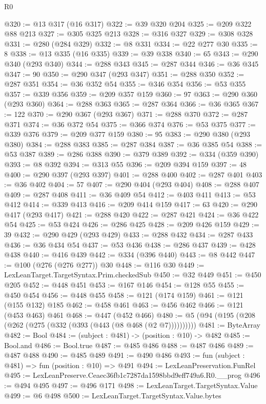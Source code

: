 \begin{lexlean}{R0}
\begin{coremodule}
@320 := @13 @317 (@16 @317)
@322 := @39 @320 @204
@325 := @209 @322 @88 @213
@327 := @305 @325 @213
@328 := @316 @327
@329 := @308 @328
@331 := @280 (@284 @329)
@332 := @8 @331
@334 := @22 @277 @30
@335 := 8
@338 := @13 @335 (@16 @335)
@339 := @39 @338
@340 := 65
@343 := @290 @340 (@293 @340)
@344 := @288 @343
@345 := @287 @344
@346 := @36 @345
@347 := 90
@350 := @290 @347 (@293 @347)
@351 := @288 @350
@352 := @287 @351
@354 := @36 @352 @54
@355 := @346 @354
@356 := @53 @355
@357 := @339 @356
@359 := @209 @357 @159
@360 := 97
@363 := @290 @360 (@293 @360)
@364 := @288 @363
@365 := @287 @364
@366 := @36 @365
@367 := 122
@370 := @290 @367 (@293 @367)
@371 := @288 @370
@372 := @287 @371
@374 := @36 @372 @54
@375 := @366 @374
@376 := @53 @375
@377 := @339 @376
@379 := @209 @377 @159
@380 := 95
@383 := @290 @380 (@293 @380)
@384 := @288 @383
@385 := @287 @384
@387 := @36 @385 @54
@388 := @53 @387
@389 := @286 @388
@390 := @379 @389
@392 := @334 (@359 @390)
@393 := @8 @392
@394 := @313 @55
@396 := @209 @394 @159
@397 := 48
@400 := @290 @397 (@293 @397)
@401 := @288 @400
@402 := @287 @401
@403 := @36 @402
@404 := 57
@407 := @290 @404 (@293 @404)
@408 := @288 @407
@409 := @287 @408
@411 := @36 @409 @54
@412 := @403 @411
@413 := @53 @412
@414 := @339 @413
@416 := @209 @414 @159
@417 := 63
@420 := @290 @417 (@293 @417)
@421 := @288 @420
@422 := @287 @421
@424 := @36 @422 @54
@425 := @53 @424
@426 := @286 @425
@428 := @209 @426 @159
@429 := 39
@432 := @290 @429 (@293 @429)
@433 := @288 @432
@434 := @287 @433
@436 := @36 @434 @54
@437 := @53 @436
@438 := @286 @437
@439 := @428 @438
@440 := @416 @439
@442 := @334 (@396 @440)
@443 := @8 @442
@447 := @100 (@276 (@276 @277)) @30
@448 := @116 @30
@449 := LexLeanTarget.TargetSyntax.Prim.checkedSub
@450 := @32 @449
@451 := @450 @205
@452 := @448 @451
@453 := @167 @146
@454 := @128 @55
@455 := @450 @454
@456 := @448 @455
@458 := @121 (@174 @159)
@461 := @121 (@155 @132) @185
@462 := @458 @461
@463 := @456 @462
@466 := @121 (@453 @463) @461
@468 := @447 (@452 @466)
@480 := @5 (@94 (@195 (@208 (@262 (@275 (@332 (@393 (@443 (@8 @468 (@2 @7))))))))))
@481 := ByteArray
@482 := Bool
@484 := (subject : @481) -> (position : @10) -> @482
@485 := Bool.and
@486 := Bool.true
@487 := @485 @486
@488 := @487 @486
@489 := @487 @488
@490 := @485 @489
@491 := @490 @486
@493 := fun (subject : @481) => fun (position : @10) => @491
@494 := LexLeanPreservation.FunRel
@495 := LexLeanPreserve.Ceaec36fb1c7287da1598bbd9eff749a6.R0.__prog
@496 := @494 @495
@497 := @496 @171
@498 := LexLeanTarget.TargetSyntax.Value
@499 := @6 @498
@500 := LexLeanTarget.TargetSyntax.Value.bytes

\end{coremodule}
\end{lexlean}
